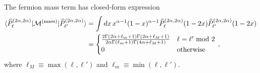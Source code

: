 \documentclass[12pt]{article}
\def\>{\rangle}
\def\<{\langle}
\newcommand{\CM}{{\cal M}}
\newcommand{\nn}{\nonumber}
\begin{document}
    The fermion mass term has closed-form expression 
    \begin{align}
    \< \widehat{P}_{\ell}^{(2\alpha,2\alpha)} | \CM^{\rm(mass)} | \widehat{P}_{\ell'}^{(2\alpha,2\alpha)} \>
    &= \int dx \,
    x^{\alpha-1} (1-x)^{\alpha-1}
    \widehat{P}_{\ell}^{(2\alpha,2\alpha)}(1-2x)
    \widehat{P}_{\ell'}^{(2\alpha,2\alpha)}(1-2x)
    \nn \\
    &= \begin{cases}
    \frac{2 \Gamma \left(2\alpha +\ell _m+1\right) \Gamma \left(2\alpha +\ell
       _M+1\right)}{2\alpha  \Gamma \left(\ell _m+1\right) \Gamma \left(4 \alpha +\ell
       _M+1\right)} & \ell = \ell' {\rm ~mod~} 2 \\
    0 & {\rm otherwise}
    \end{cases}
     \, ,
    \end{align}
    where $\ell_M \equiv \max(\ell,\ell')$ and $\ell_m \equiv \min(\ell,\ell')$.
\end{document}
